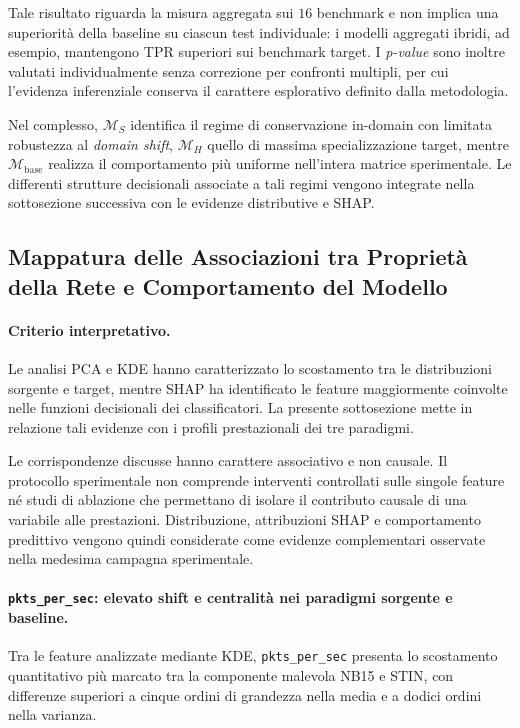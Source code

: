 Tale risultato riguarda la misura aggregata sui $16$ benchmark e non implica una superiorità della baseline su ciascun test individuale: i modelli aggregati ibridi, ad esempio, mantengono TPR superiori sui benchmark target.
I \textit{p-value} sono inoltre valutati individualmente senza correzione per confronti multipli, per cui l'evidenza inferenziale conserva il carattere esplorativo definito dalla metodologia.

Nel complesso, $\mathcal{M}_{S}$ identifica il regime di conservazione in-domain con limitata robustezza al \textit{domain shift}, $\mathcal{M}_{H}$ quello di massima specializzazione target, mentre $\mathcal{M}_{\mathrm{base}}$ realizza il comportamento più uniforme nell'intera matrice sperimentale. 
Le differenti strutture decisionali associate a tali regimi vengono integrate nella sottosezione successiva con le evidenze distributive e SHAP.



\subsection{Mappatura delle Associazioni tra Proprietà della Rete e Comportamento del Modello}
\label{subsec:sintesi_causa_effetto}

\paragraph{Criterio interpretativo.}
Le analisi PCA e KDE hanno caratterizzato lo scostamento tra le distribuzioni sorgente e target, mentre SHAP ha identificato le feature maggiormente coinvolte nelle funzioni decisionali dei classificatori. 
La presente sottosezione mette in relazione tali evidenze con i profili prestazionali dei tre paradigmi.

Le corrispondenze discusse hanno carattere associativo e non causale. 
Il protocollo sperimentale non comprende interventi controllati sulle singole feature né studi di ablazione che permettano di isolare il contributo causale di una variabile alle prestazioni. 
Distribuzione, attribuzioni SHAP e comportamento predittivo vengono quindi considerate come evidenze complementari osservate nella medesima campagna sperimentale.

\paragraph{\texttt{pkts\_per\_sec}: elevato shift e centralità nei paradigmi sorgente e baseline.}
Tra le feature analizzate mediante KDE, \texttt{pkts\_per\_sec} presenta lo scostamento quantitativo più marcato tra la componente malevola NB15 e STIN, con differenze superiori a cinque ordini di grandezza nella media e a dodici ordini nella varianza.

